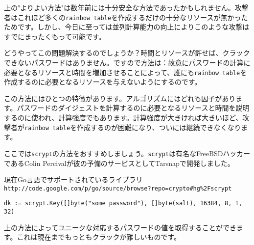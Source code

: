 上の"よりよい方法"は数年前には十分安全な方法であったかもしれません。攻撃者はこれほど多くの\texttt{rainbow table}を作成するだけの十分なリソースが無かったためです。しかし、今日に至っては並列計算能力の向上によりこのような攻撃はすでにまったくもって可能です。

どうやってこの問題解決するのでしょうか？時間とリソースが許せば、クラックできないパスワードはありません。ですので方法は：故意にパスワードの計算に必要となるリソースと時間を増加させることによって、誰にも\texttt{rainbow table}を作成するのに必要となるリソースを与えないようにするのです。

この方法にはひとつの特徴があります。アルゴリズムにはどれも因子があります。パスワードのダイジェストを計算するのに必要となるリソースと時間を説明するのに使われ、計算強度でもあります。計算強度が大きければ大きいほど、攻撃者が\texttt{rainbow table}を作成するのが困難になり、ついには継続できなくなります。

ここでは\texttt{scrypt}の方法をおすすめしましょう。\texttt{scrypt}は有名なFreeBSDハッカーであるColin Percivalが彼の予備のサービスとしてTarsnapで開発しました。

現在Go言語でサポートされているライブラリ\texttt{http://code.google.com/p/go/source/browse?repo=crypto\#hg\%2Fscrypt}

\begin{lstlisting}[numbers=none]
dk := scrypt.Key([]byte("some password"), []byte(salt), 16384, 8, 1, 32)
\end{lstlisting}

上の方法によってユニークな対応するパスワードの値を取得することができます。これは現在までもっともクラックが難しいものです。

